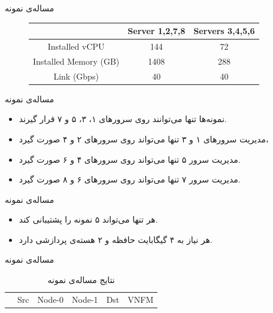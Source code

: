 \documentclass{beamer}
\makeatletter
\newcommand{\RTList}{\raggedleft\rightskip\@totalleftmargin}
\makeatother
\begin{document}
\begin{persian}
\begin{frame}{مساله‌ی نمونه}
\begin{figure}[h!]
\begin{center}
\begin{latin}
\begin{tabular}{|c|c|c|}
            \hline
            & Server 1,2,7,8 & Servers 3,4,5,6 \\
            \hline
            Installed vCPU & 144 & 72 \\
            \hline
            Installed Memory (GB) & 1408 & 288 \\
            \hline
            Link (Gbps) & 40 & 40 \\
            \hline
        \end{tabular}\end{latin}\end{center}
    \end{figure}
\end{frame}
\begin{frame}{مساله‌ی نمونه}
    \begin{itemize}\RTList{}
        \item نمونه‌ها تنها می‌توانند روی سرورهای ۱، ۳، ۵ و ۷ قرار گیرند.
        \item مدیریت سرورهای ۱ و ۳ تنها می‌تواند روی سرورهای ۲ و ۴  صورت گیرد،
        \item مدیریت سرور ۵ تنها می‌تواند روی سرورهای ۴ و ۶ صورت گیرد.
        \item مدیریت سرور ۷ تنها می‌تواند روی سرورهای ۶ و ۸ صورت گیرد.
    \end{itemize}
\end{frame}
\begin{frame}{مساله‌ی نمونه}
    \begin{itemize}\RTList{}
        \item هر  تنها می‌تواند ۵ نمونه را پشتیبانی کند.
        \item هر  نیاز به ۴ گیگابایت حافظه و ۲ هسته‌ی پردازشی دارد.
    \end{itemize}
\end{frame}
\begin{frame}{مساله‌ی نمونه}
    \begin{table}[h!]
        \caption{نتایج مساله‌ی نمونه}
        \vspace{0.5cm}
        \begin{center}\begin{latin}\begin{tabular}{|c|c|c|c|c|c|}
            \hline
            & Src & Node-0 & Node-1 & Dst & VNFM \\

\end{tabular}
\end{latin}
\end{center}
\end{table}
\end{frame}
\end{persian}
\end{document}
